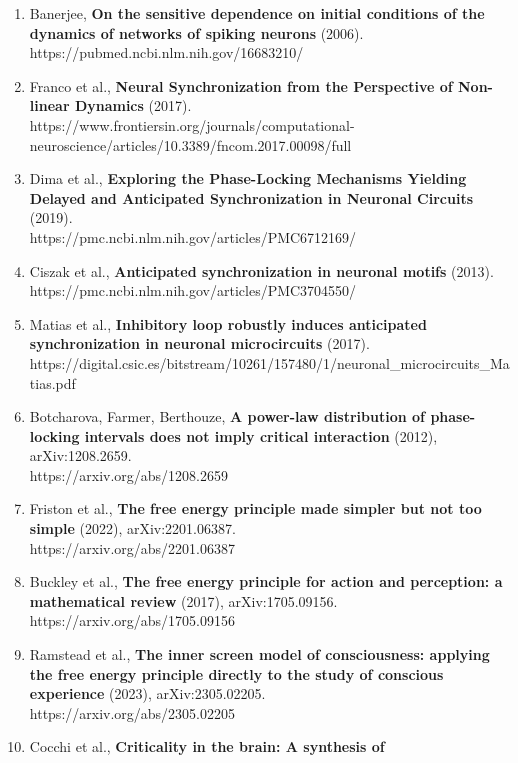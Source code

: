\documentclass[
]{article}
\begin{document}
\begin{enumerate}
{  brain networks}.\\
  https://pmc.ncbi.nlm.nih.gov/articles/PMC2746490/
\item
  Banerjee, \textbf{On the sensitive dependence on initial conditions of
  the dynamics of networks of spiking neurons} (2006).\\
  https://pubmed.ncbi.nlm.nih.gov/16683210/
\item
  Franco et al., \textbf{Neural Synchronization from the Perspective of
  Non-linear Dynamics} (2017).\\
  https://www.frontiersin.org/journals/computational-neuroscience/articles/10.3389/fncom.2017.00098/full
\item
  Dima et al., \textbf{Exploring the Phase-Locking Mechanisms Yielding
  Delayed and Anticipated Synchronization in Neuronal Circuits}
  (2019).\\
  https://pmc.ncbi.nlm.nih.gov/articles/PMC6712169/
\item
  Ciszak et al., \textbf{Anticipated synchronization in neuronal motifs}
  (2013).\\
  https://pmc.ncbi.nlm.nih.gov/articles/PMC3704550/
\item
  Matias et al., \textbf{Inhibitory loop robustly induces anticipated
  synchronization in neuronal microcircuits} (2017).\\
  https://digital.csic.es/bitstream/10261/157480/1/neuronal\_microcircuits\_Matias.pdf
\item
  Botcharova, Farmer, Berthouze, \textbf{A power-law distribution of
  phase-locking intervals does not imply critical interaction} (2012),
  arXiv:1208.2659.\\
  https://arxiv.org/abs/1208.2659
\item
  Friston et al., \textbf{The free energy principle made simpler but not
  too simple} (2022), arXiv:2201.06387.\\
  https://arxiv.org/abs/2201.06387
\item
  Buckley et al., \textbf{The free energy principle for action and
  perception: a mathematical review} (2017), arXiv:1705.09156.\\
  https://arxiv.org/abs/1705.09156
\item
  Ramstead et al., \textbf{The inner screen model of consciousness:
  applying the free energy principle directly to the study of conscious
  experience} (2023), arXiv:2305.02205.\\
  https://arxiv.org/abs/2305.02205
\item
  Cocchi et al., \textbf{Criticality in the brain: A synthesis of
}
\end{enumerate}
\end{document}
